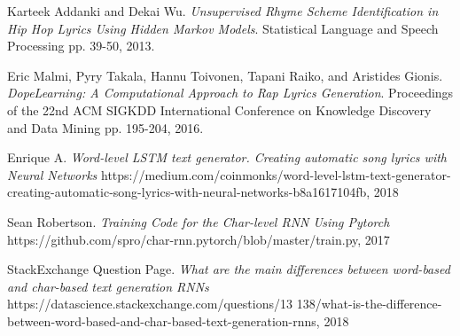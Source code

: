 \documentclass[11pt,a4paper]{article}
\begin{document}




\medskip
 
\begin{thebibliography}{9}
Karteek Addanki and Dekai Wu.
\textit{Unsupervised Rhyme Scheme Identification in Hip Hop Lyrics Using Hidden Markov Models}.
 Statistical Language and Speech Processing pp. 39-50, 2013.
 
Eric Malmi, Pyry Takala, Hannu Toivonen, Tapani Raiko, and Aristides Gionis. 
\textit{DopeLearning: A Computational Approach to Rap Lyrics Generation}.
Proceedings of the 22nd ACM SIGKDD International Conference on Knowledge Discovery and Data Mining pp. 195-204, 2016.

Enrique A.
\textit{Word-level LSTM text generator. Creating automatic song lyrics with Neural Networks}
https://medium.com/coinmonks/word-level-lstm-text-generator-creating-automatic-song-lyrics-with-neural-networks-b8a1617104fb, 2018

Sean Robertson.
\textit{Training Code for the Char-level RNN Using Pytorch}
https://github.com/spro/char-rnn.pytorch/blob/master/train.py, 2017

StackExchange Question Page.
\textit{What are the main differences between word-based and char-based text generation RNNs}
https://datascience.stackexchange.com/questions/13
138/what-is-the-difference-between-word-based-and-char-based-text-generation-rnns, 2018
\end{thebibliography}
\end{document}
